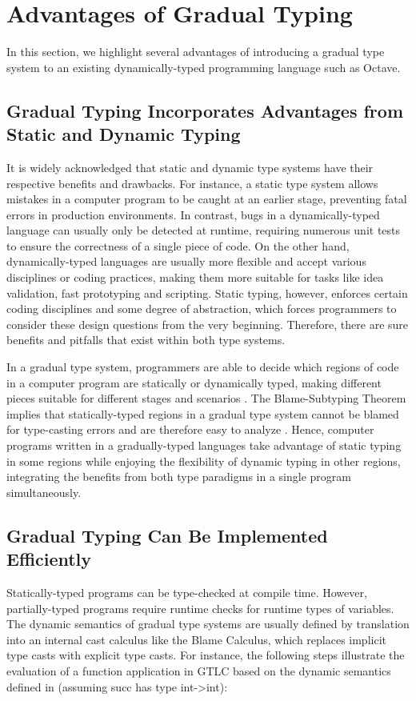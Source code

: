 \section{Advantages of Gradual Typing}
In this section, we highlight several advantages of introducing a gradual type system to an existing dynamically-typed programming language such as Octave.

\subsection{Gradual Typing Incorporates Advantages from Static and Dynamic Typing}
It is widely acknowledged that static and dynamic type systems have their respective benefits and drawbacks. For instance, a static type system allows mistakes in a computer program to be caught at an earlier stage, preventing fatal errors in production environments. In contrast, bugs in a dynamically-typed language can usually only be detected at runtime, requiring numerous unit tests to ensure the correctness of a single piece of code. On the other hand, dynamically-typed languages are usually more flexible and accept various disciplines or coding practices, making them more suitable for tasks like idea validation, fast prototyping and scripting. Static typing, however, enforces certain coding disciplines and some degree of abstraction, which forces programmers to consider these design questions from the very beginning. Therefore, there are sure benefits and pitfalls that exist within both type systems.

In a gradual type system, programmers are able to decide which regions of code in a computer program are statically or dynamically typed, making different pieces suitable for different stages and scenarios \cite{siek2006gradual}. The Blame-Subtyping Theorem implies that statically-typed regions in a gradual type system cannot be blamed for type-casting errors and are therefore easy to analyze \cite{siek2015refined}. Hence, computer programs written in a gradually-typed languages take advantage of static typing in some regions while enjoying the flexibility of dynamic typing in other regions, integrating the benefits from both type paradigms in a single program simultaneously.

\subsection{Gradual Typing Can Be Implemented Efficiently}
Statically-typed programs can be type-checked at compile time. However, partially-typed programs require runtime checks for runtime types of variables. The dynamic semantics of gradual type systems are usually defined by translation into an internal cast calculus like the Blame Calculus, which replaces implicit type casts with explicit type casts. For instance, the following steps illustrate the evaluation of a function application in GTLC based on the dynamic semantics defined in \cite{siek2006gradual} (assuming succ has type int->int):

